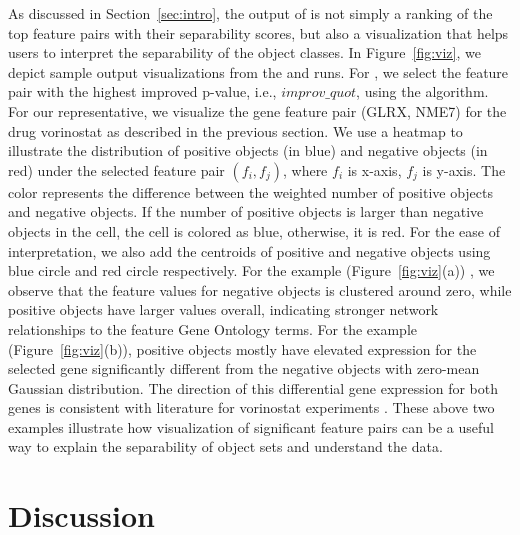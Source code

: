 As discussed in Section~\ref{sec:intro}, the output of \genviz is not simply a ranking of the top feature pairs with their separability scores, but also a visualization that helps users to interpret the separability of the object classes. In Figure~\ref{fig:viz}, we depict sample output visualizations from the \msig and \lincs runs. For \msig, we select the feature pair with the highest improved p-value, i.e., $improv\_quot$, using the \sampOpt algorithm. For our \lincs representative, we visualize the gene feature pair (GLRX, NME7) for the drug vorinostat as described in the previous section. We use a heatmap to illustrate the distribution of positive objects (in blue) and negative objects (in red) under the selected feature pair $(f_i,f_j)$, where $f_i$ is x-axis, $f_j$ is y-axis. The color represents the difference between the weighted number of positive objects and negative objects. If the number of positive objects is larger than negative objects in the cell, the cell is colored as blue, otherwise, it is red. For the ease of interpretation, we also add the centroids of positive and negative objects using blue circle and red circle respectively. For the \msig example (Figure~\ref{fig:viz}(a)) , we observe that the feature values for negative objects is clustered around zero, while positive objects have larger values overall, indicating stronger network relationships to the feature Gene Ontology terms. For the \lincs example (Figure~\ref{fig:viz}(b)), positive objects mostly have elevated expression for the selected gene significantly different from the negative objects with zero-mean Gaussian distribution. The direction of this differential gene expression for both genes is consistent with literature for vorinostat experiments . These above two examples illustrate how visualization of significant feature pairs can be a useful way to explain the separability of object sets and understand the data.



\section{Discussion}\label{sec:disc}

